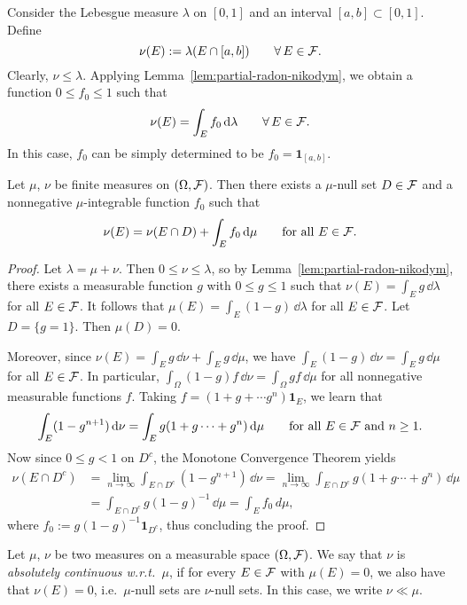 \begin{example}
	Consider the Lebesgue measure $\lambda$ on $[0,1]$ and an interval $[a,b]\subset[0,1]$. Define
	\[
		\nu(E) := \lambda(E\cap [a,b])\qquad\forall\,E\in\mathcal F.
	\]
	Clearly, $\nu\le \lambda$. Applying Lemma~\ref{lem:partial-radon-nikodym}, we obtain a function $0\le f_0\le 1$ such that
	\[
		\nu(E) = \int_E f_0\,\mathrm{d}\lambda\qquad\forall\,E\in\mathcal F.
	\]
	In this case, $f_0$ can be simply determined to be $f_0 = \mathbf{1}_{[a,b]}$.
\end{example}

\begin{theorem}\label{thm:radon-nikodym}
	Let $\mu$, $\nu$ be finite measures on $(\Omega,\mathcal F)$. Then there exists a $\mu$-null set $D\in\mathcal F$ and a nonnegative $\mu$-integrable function $f_0$ such that
	\[
		\nu(E) = \nu(E\cap D) + \int_E f_0\,\mathrm{d}\mu\qquad\text{for all $E\in\mathcal F$}.
	\]
\end{theorem}
\begin{proof}
	Let $\lambda=\mu+\nu$. Then $0\le \nu\le \lambda$, so by Lemma~\ref{lem:partial-radon-nikodym}, there exists a measurable function $g$ with $0\le g\le 1$ such that $\nu(E)=\int_E g\,\dd\lambda$ for all $E\in\mathcal F$. It follows that
	$\mu(E) = \int_E (1-g)\,\dd\lambda$ for all $E\in\mathcal F$. Let $D=\{g=1\}$. Then $\mu(D) = 0$. 
	
	Moreover, since $\nu(E)=\int_E g\,\dd\nu + \int_E g\,\dd\mu$, we have $\int_E (1-g)\,\dd\nu = \int_E g\,\dd\mu$ for all $E\in\mathcal F$. In particular, $\int_\Omega (1-g)f\,\dd\nu = \int_\Omega gf\,\dd\mu$ for all nonnegative measurable functions $f$. Taking $f=(1+g +\cdots g^n)\mathbf{1}_E$, we learn that
	\[
		\int_E (1-g^{n+1})\,\mathrm{d}\nu = \int_E g(1+g\cdots+g^n)\,\mathrm{d}\mu\qquad\text{for all $E\in\mathcal F$ and $n\ge 1$}.
	\]
	Now since $0\le g <1$ on $D^c$, the Monotone Convergence Theorem yields
	\begin{align*}
		\nu(E\cap D^c) &= \lim_{n\to\infty} \int_{E\cap D^c} (1-g^{n+1})\,\dd\nu = \lim_{n\to\infty}\int_{E\cap D^c} g(1+g\cdots+g^n)\,\dd\mu \\
		&=\int_{E\cap D^c} g(1-g)^{-1}\,\dd\mu = \int_E f_0\,d\mu,
	\end{align*}
	where $f_0:= g(1-g)^{-1}\mathbf{1}_{D^c}$, thus concluding the proof.
\end{proof}

\begin{definition}
	Let $\mu$, $\nu$ be two measures on a measurable space $(\Omega, \mathcal F)$.
	We say that $\nu$ is \emph{absolutely continuous w.r.t.\ $\mu$}, if for every $E\in\mathcal F$ with $\mu(E)=0$, we also have that $\nu(E)=0$, i.e.\ $\mu$-null sets are $\nu$-null sets. In this case, we write $\nu\ll\mu$.
\end{definition}

